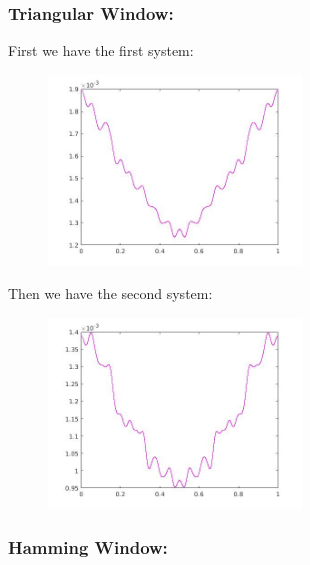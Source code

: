 \documentclass[a4paper,11pt]{article}
\begin{document}
\newpage

\subsubsection{Triangular Window:}

First we have the first system:

\begin{figure}[!hp]
    \begin{center}
    \includegraphics[width=0.6\textwidth]{images/lab4_25.jpg}
    \end{center}
\end{figure}

Then we have the second system:

\begin{figure}[!hp]
    \begin{center}
    \includegraphics[width=0.6\textwidth]{images/lab4_35.jpg}
    \end{center}
\end{figure}

\newpage

\subsubsection{Hamming Window:}
\end{document}
